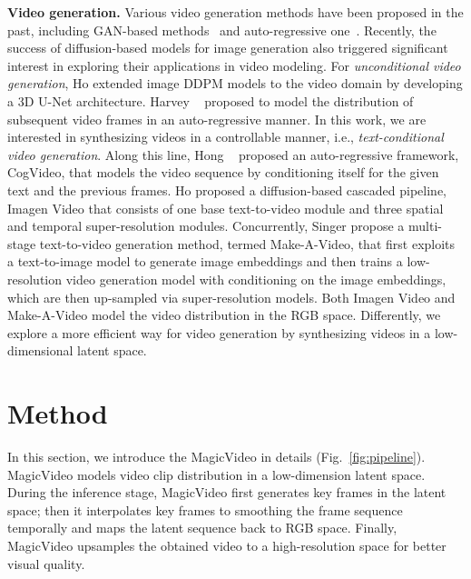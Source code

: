 \documentclass[10pt,twocolumn,letterpaper]{article}
\newcommand{\myPara}[1]{\vspace{6pt}\noindent\textbf{#1}}
\begin{document}
\myPara{Video generation.} Various video generation methods have been proposed in the past, including   GAN-based methods~\cite{vondrick_generating_2016, clark_adversarial_2019, tulyakov_mocogan_2017} and auto-regressive one~\cite{ranzato_video_2016, kalchbrenner_video_2017, babaeizadeh_fitvid_2021, kumar_videoflow_2020, mathieu_deep_2016, hong_cogvideo_2022}. Recently, the success of diffusion-based   models for image generation also triggered significant interest in exploring their applications in video modeling. For \textit{unconditional video generation}, Ho \etal  \cite{ho_video_2022} extended image DDPM models to the video domain by developing a 3D U-Net architecture. Harvey \etal~\cite{harvey_flexible_2022} proposed to model the distribution of subsequent video frames   in an auto-regressive manner. In this work, we are interested in synthesizing videos in a controllable manner, i.e., \textit{text-conditional video generation}.
Along this line, Hong \etal~\cite{CogVideo} proposed an auto-regressive framework, CogVideo, that models the video sequence by conditioning  itself for the given text and the previous frames.  Ho \etal \cite{ho_imagen_2022} proposed a diffusion-based cascaded pipeline, Imagen Video that consists of one base text-to-video module and three spatial and temporal super-resolution modules. 
Concurrently, Singer \etal  \cite{singer_make--video_2022} propose a multi-stage text-to-video generation method, termed Make-A-Video, that first exploits a text-to-image model to generate image embeddings and then trains a low-resolution video generation model with conditioning on the image embeddings, which are then up-sampled via   super-resolution models. Both Imagen Video and Make-A-Video model the video distribution in the RGB space. Differently, we explore a   more efficient way for video generation by synthesizing videos in a low-dimensional latent space. 
\section{Method}
In this section, we introduce the MagicVideo in details (Fig.~\ref{fig:pipeline}). 
MagicVideo models video clip distribution in a low-dimension latent space. During the inference stage, MagicVideo first generates key frames in the latent space; then it interpolates key frames to smoothing the frame sequence temporally and maps the latent sequence back to RGB space. Finally, MagicVideo upsamples the obtained video to a high-resolution space for better visual quality.
\end{document}
